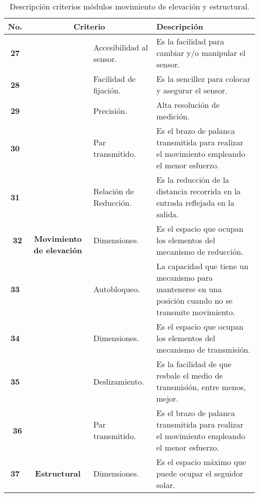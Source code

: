 \begin{table}[H]
	\centering
	\small
	\caption{Descripción criterios módulos movimiento de elevación y estructural.}
	\begin{tabular}{|c|c|p{10em}|p{21em}|}
		\hline
		\multicolumn{1}{|p{1.715em}|}{\textbf{\footnotesize No.}} & \multicolumn{2}{p{9em}|}{\textbf{Criterio}} & \textbf{Descripción} \\
		\hline
		\hline
		\textbf{ 27} & \multicolumn{1}{c|}{\multirow{10}[30]{*}{\begin{sideways}\textbf{ Movimiento de elevación}\end{sideways}}} & \multicolumn{1}{l|}{ Accesibilidad al sensor.} & \multicolumn{1}{l|}{ Es la facilidad para cambiar y/o manipular el sensor.} \\
		\cline{1-1}\cline{3-4}    \textbf{ 28} &       &  Facilidad de fijación. &  Es la sencillez para colocar y asegurar el sensor. \\
		\cline{1-1}\cline{3-4}    \textbf{ 29} &       &  Precisión. &  Alta resolución de medición. \\
		\cline{1-1}\cline{3-4}    \textbf{ 30} &       &  Par transmitido. &  Es el brazo de palanca transmitida para realizar el movimiento empleando el menor esfuerzo. \\
		\cline{1-1}\cline{3-4}    \textbf{ 31} &       &  Relación de Reducción. &  Es la reducción de la distancia recorrida en la entrada reflejada en la salida. \\
		\cline{1-1}\cline{3-4}    \textbf{\ 32} &       &  Dimensiones. &  Es el espacio que ocupan los elementos del mecanismo de reducción. \\
		\cline{1-1}\cline{3-4}    \textbf{ 33} &       &  Autobloqueo. &  La capacidad que tiene un mecanismo para mantenerse en una posición cuando no se transmite movimiento. \\
		\cline{1-1}\cline{3-4}    \textbf{ 34} &       &  Dimensiones. &  Es el espacio que ocupan los elementos del mecanismo de transmisión. \\
		\cline{1-1}\cline{3-4}    \textbf{ 35} &       &  Deslizamiento. &  Es la facilidad de que resbale el medio de transmisión, entre menos, mejor. \\
		\cline{1-1}\cline{3-4}    \textbf{\ 36} &       &  Par transmitido. &  Es el brazo de palanca transmitida para realizar el movimiento empleando el menor esfuerzo. \\
		\hline
		\textbf{37} & \multicolumn{1}{c|}{\multirow{3}[33]{*}{\begin{sideways}\textbf{Estructural}\end{sideways}}} & Dimensiones. & Es el espacio máximo que puede ocupar el seguidor solar. \\

\end{tabular}
\end{table}
